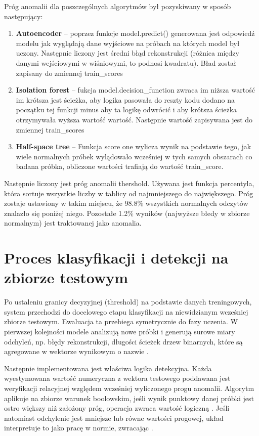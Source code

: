 \documentclass[12pt,twoside]{article}
\begin{document}
Próg anomalii dla poszczególnych algorytmów był pozyskiwany w sposób następujący:
\begin{enumerate}[label=\alph*), leftmargin=1.25cm] 
\item \textbf{Autoencoder} --
poprzez funkcje model.predict() generowana jest odpowiedź modelu jak wyglądają dane wyjściowe na próbach na których model był uczony. Następnie liczony jest średni błąd rekonstrukcji (różnica między danymi wejściowymi w wiśniowymi, to podnosi kwadratu). Bład został zapisany do zmiennej train\_scores
\item \textbf{Isolation forest} --
fukcja model.decision\_function zwraca im niższa wartość im krótsza jest ścieżka, aby logika pasowała do reszty kodu dodano na początku tej funkcji minus aby ta logikę odwrócić i aby krótsza ścieżka otrzymywała wyższa wartość wartość. Następnie wartość zapisywana jest do zmiennej train\_scores 

\item \textbf{Half-space tree} -- 
Funkcja score one wylicza wynik na podstawie tego, jak wiele normalnych próbek wylądowało wcześniej w tych samych obszarach co badana próbka, obliczone wartości  trafiają do wartość train\_score.  

\end{enumerate}
Następnie liczony jest próg anomalii thershold. Używana jest funkcja percentyla, która sortuje wszystkie liczby w tablicy od najmniejszego do największego. Próg zostaje ustawiony w takim miejscu, że 98.8\% wszystkich normalnych odczytów znalazło się poniżej niego. Pozostałe 1.2\% wyników (najwyższe błedy w zbiorze normalnym) jest traktowanej jako anomalia.

\section{Proces klasyfikacji i detekcji na zbiorze testowym}
Po ustaleniu granicy decyzyjnej (threshold) na podstawie danych treningowych, system przechodzi do docelowego etapu klasyfikacji na niewidzianym wcześniej zbiorze testowym. Ewaluacja ta przebiega symetrycznie do fazy uczenia. W pierwszej kolejności modele analizują nowe próbki i generują surowe miary odchyleń, np. błędy rekonstrukcji, długości ścieżek drzew binarnych, które są agregowane w wektorze wynikowym o nazwie .

Następnie implementowana jest właściwa logika detekcyjna. Każda wyestymowana wartość numeryczna z wektora testowego poddawana jest weryfikacji relacyjnej względem wcześniej wyliczonego progu anomalii. Algorytm aplikuje na zbiorze warunek boolowskim, jeśli wynik punktowy danej próbki jest ostro większy niż założony próg, operacja zwraca wartość logiczną . Jeśli natomiast odchylenie jest mniejsze lub równe wartości progowej, układ interpretuje to jako pracę w normie, zwracając .
\end{document}
